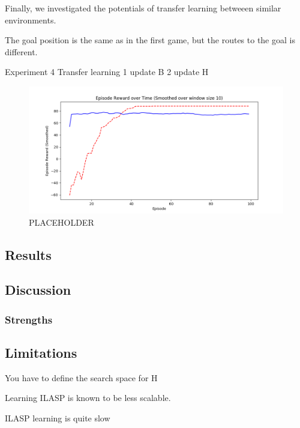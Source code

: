 Finally, we investigated the potentials of transfer learning betweeen similar environments. 

The goal position is the same as in the first game, but the routes to the goal is different. 

Experiment 4 Transfer learning 
    1 update B
    2 update H


\begin{figure}[!htb]
\centering
\includegraphics[width=1.0\textwidth]{./figures/placeholder}
\caption{PLACEHOLDER}
\label{proposed_architecture}
\end{figure}


\subsection{Results}

\subsection{Discussion}
\subsubsection{Strengths}

\subsection{Limitations}

You have to define the search space for H

Learning ILASP is known to be less scalable. 

ILASP learning is quite slow
